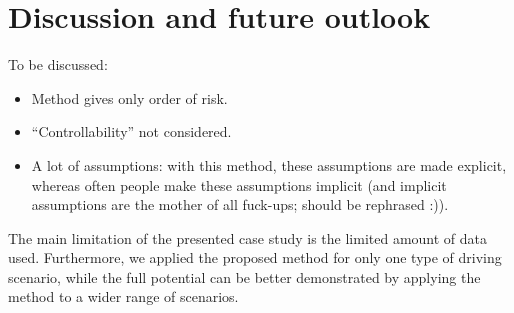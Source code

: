 \section{Discussion and future outlook} %
\label{sec:discussion}

To be discussed:
\begin{itemize}
	\item Method gives only order of risk.
	\item ``Controllability'' not considered.
	\item A lot of assumptions: with this method, these assumptions are made explicit, whereas often people make these assumptions implicit (and implicit assumptions are the mother of all fuck-ups; should be rephrased :)).
\end{itemize}


The main limitation of the presented case study is the limited amount of data used. Furthermore, we applied the proposed method for only one type of driving scenario, while the full potential can be better demonstrated by applying the method to a wider range of scenarios.